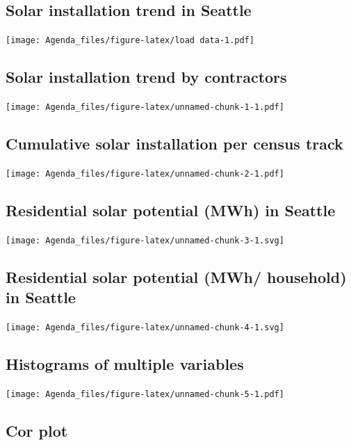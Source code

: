 \documentclass[]{article}
\begin{document}
\subsection{Solar installation trend in
Seattle}\label{solar-installation-trend-in-seattle}

\texttt{[image: Agenda\_files/figure-latex/load data-1.pdf]}

\subsection{Solar installation trend by
contractors}\label{solar-installation-trend-by-contractors}

\texttt{[image: Agenda\_files/figure-latex/unnamed-chunk-1-1.pdf]}

\subsection{Cumulative solar installation per census
track}\label{cumulative-solar-installation-per-census-track}

\texttt{[image: Agenda\_files/figure-latex/unnamed-chunk-2-1.pdf]}

\subsection{Residential solar potential (MWh) in
Seattle}\label{residential-solar-potential-mwh-in-seattle}

\texttt{[image: Agenda\_files/figure-latex/unnamed-chunk-3-1.svg]}

\subsection{Residential solar potential (MWh/ household) in
Seattle}\label{residential-solar-potential-mwh-household-in-seattle}

\texttt{[image: Agenda\_files/figure-latex/unnamed-chunk-4-1.svg]}

\subsection{Histograms of multiple
variables}\label{histograms-of-multiple-variables}

\texttt{[image: Agenda\_files/figure-latex/unnamed-chunk-5-1.pdf]}

\subsection{Cor plot}\label{cor-plot}
\end{document}
